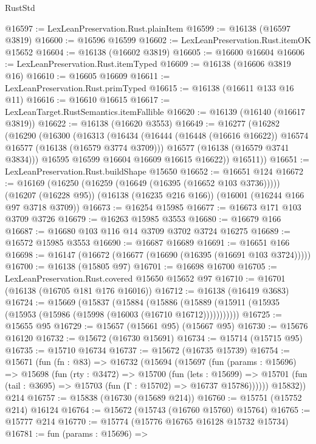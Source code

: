 \begin{lexlean}{RustStd}
\begin{coremodule}
@16597 := LexLeanPreservation.Rust.plainItem
@16599 := @16138 (@16597 @3819)
@16600 := @16596 @16599
@16602 := LexLeanPreservation.Rust.itemOK @15652
@16604 := @16138 (@16602 @3819)
@16605 := @16600 @16604
@16606 := LexLeanPreservation.Rust.itemTyped
@16609 := @16138 (@16606 @3819 @16)
@16610 := @16605 @16609
@16611 := LexLeanPreservation.Rust.primTyped
@16615 := @16138 (@16611 @133 @16 @11)
@16616 := @16610 @16615
@16617 := LexLeanTarget.RustSemantics.itemFallible
@16620 := @16139 (@16140 (@16617 @3819))
@16622 := @16138 (@16620 @3553)
@16649 := @16277
    (@16282
      (@16290
        (@16300
          (@16313
            (@16434
              (@16444 (@16448 (@16616 @16622)) @16574 @16577 (@16138 (@16579 @3774 @3709)))
              @16577
              (@16138 (@16579 @3741 @3834)))
            @16595
            @16599
            @16604
            @16609
            @16615
            @16622))
        @16511))
@16651 := LexLeanPreservation.Rust.buildShape @15650
@16652 := @16651 @124
@16672 := @16169
    (@16250 (@16259 (@16649 (@16395 (@16652 @103 @3736)))))
    (@16207 (@16228 @95))
    (@16138 (@16235 @216 @166))
    (@16001 (@16244 @166 @97 @3718 @3709))
@16673 := @16254 @15985
@16677 := @16673 @171 @103 @3709 @3726
@16679 := @16263 @15985 @3553
@16680 := @16679 @166
@16687 := @16680 @103 @116 @14 @3709 @3702 @3724 @16275
@16689 := @16572 @15985 @3553
@16690 := @16687 @16689
@16691 := @16651 @166
@16698 := @16147 (@16672 (@16677 (@16690 (@16395 (@16691 @103 @3724)))))
@16700 := @16138 (@15805 @97)
@16701 := @16698 @16700
@16705 := LexLeanPreservation.Rust.covered @15650 @15652 @97
@16710 := @16701 (@16138 (@16705 @181 @176 @16016))
@16712 := @16138 (@16419 @3683)
@16724 := @15669
    (@15837
      (@15884
        (@15886 (@15889 (@15911 (@15935 (@15953 (@15986 (@15998 (@16003 (@16710 @16712)))))))))))
@16725 := @15655 @95
@16729 := @15657 (@15661 @95) (@15667 @95)
@16730 := @15676 @16120
@16732 := @15672 (@16730 @15691)
@16734 := @15714 (@15715 @95)
@16735 := @15710 @16734
@16737 := @15672 (@16735 @15739)
@16754 := @15671
    (fun (fn : @83) =>
    @16732
      (@15694
        (@15697
          (fun (params : @15696) =>
          @15698
            (fun (rty : @3472) =>
            @15700
              (fun (lets : @15699) =>
              @15701 (fun (tail : @3695) => @15703 (fun (Γ : @15702) => @16737 @15786))))))
        @15832))
    @214
@16757 := @15838 (@16730 (@15689 @214))
@16760 := @15751 (@15752 @214) @16124
@16764 := @15672 (@15743 (@16760 @15760) @15764)
@16765 := @15777 @214
@16770 := @15774 (@15776 @16765 @16128 @15732 @15734)
@16781 := fun (params : @15696) =>

\end{coremodule}
\end{lexlean}
